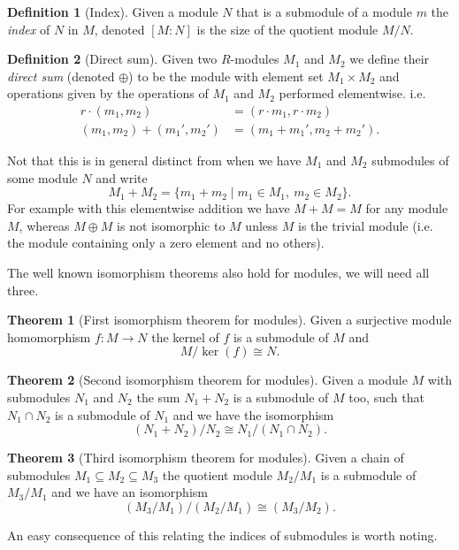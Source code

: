 \documentclass[12pt,a4paper,abstracton,bibtotoc]{scrreprt}
\theoremstyle{definition}
\newtheorem{thm}{Theorem}
\newtheorem{defn}{Definition}
\begin{document}
\begin{defn}[Index]
Given a module $N$ that is a submodule of a module $m$ the \emph{index} of $N$ in $M$, denoted $[M:N]$ is the size of the quotient module $M / N$.
\end{defn}

\begin{defn}[Direct sum]
Given two $R$-modules $M_1$ and $M_2$ we define their \emph{direct sum} (denoted $\oplus$) to be the module with element set $M_1 \times M_2$ and operations given by the operations of $M_1$ and $M_2$ performed elementwise. i.e.
\begin{align*}
r\cdot(m_1,m_2) &= (r\cdot m_1, r\cdot m_2)\\
(m_1,m_2) + (m_1',m_2') &= (m_1 + m_1',m_2+m_2').
\end{align*}
\end{defn}

Not that this is in general distinct from when we have $M_1$ and $M_2$ submodules of some module $N$ and write
\[
M_1 + M_2 = \{m_1 + m_2 \mid m_1\in M_1,\ m_2\in M_2\}.
\]
For example with this elementwise addition we have $M + M = M$ for any module $M$, whereas $M\oplus M$ is not isomorphic to $M$ unless $M$ is the trivial module (i.e. the module containing only a zero element and no others).

The well known isomorphism theorems also hold for modules, we will need all three.

\begin{thm}[First isomorphism theorem for modules]
Given a surjective module homomorphism $f\colon M \to N$ the kernel of $f$ is a submodule of $M$ and
\[
M/\ker(f) \cong N.
\]
\end{thm}

\begin{thm}[Second isomorphism theorem for modules]
Given a module $M$ with submodules $N_1$ and $N_2$ the sum $N_1 + N_2$ is a submodule of $M$ too, such that $N_1 \cap N_2$ is a submodule of $N_1$ and we have the isomorphism
\[
(N_1 + N_2)/N_2 \cong N_1/(N_1 \cap N_2).
\]
\end{thm}

\begin{thm}[Third isomorphism theorem for modules]
Given a chain of submodules $M_1 \subseteq M_2 \subseteq M_3$ the quotient module $M_2/M_1$ is a submodule of $M_3/M_1$ and we have an isomorphism
\[
(M_3/M_1)/(M_2/M_1) \cong (M_3/M_2).
\]
\end{thm}

An easy consequence of this relating the indices of submodules is worth noting.
\end{document}
